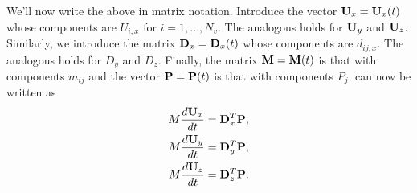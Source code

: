 \documentclass[11pt]{article}
\begin{document}
We'll now write the above in matrix notation. Introduce the vector $\mathbf{U}_x = \mathbf{U}_x(t)$ whose components are $U_{i,x}$ for $i=1,...,N_v$. The analogous holds for $\mathbf{U}_y$ and $\mathbf{U}_z$. Similarly, we introduce the matrix $\mathbf{D}_x = \mathbf{D}_x(t)$ whose components are $d_{ij,x}$. The analogous holds for $D_y$ and $D_z$. Finally, the matrix $\mathbf{M}=\mathbf{M}(t)$ is that with components $m_{ij}$ and the vector $\mathbf{P} = \mathbf{P}(t)$ is that with components $P_j$.  can now be written as 
\begin{align}
    M \frac{d \mathbf{U}_x}{dt} &= \mathbf{D}_x^T \mathbf{P}, \nonumber \\
    M \frac{d \mathbf{U}_y}{dt} &= \mathbf{D}_y^T \mathbf{P}, \nonumber \\
    M \frac{d \mathbf{U}_z}{dt} &= \mathbf{D}_z^T\mathbf{P}.
\end{align}
\end{document}
